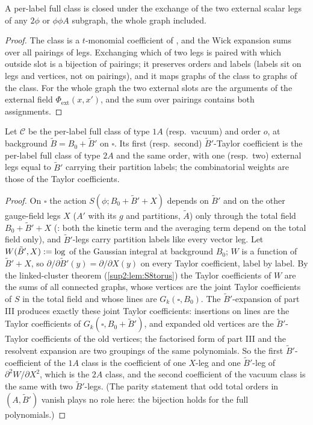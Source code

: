 \begin{lemma}\label{sup4:lem:S1441}
A per-label full class is closed under the exchange of the two external scalar legs of any $2\phi$ or $\phi\phi A$ subgraph, the whole graph included.
\end{lemma}

\begin{proof}
The class is a $t$-monomial coefficient of \cite[(1.5)]{Ba3}, and the Wick expansion sums over all pairings of legs. Exchanging which of two legs is paired with which outside slot is a bijection of pairings; it preserves orders and labels (labels sit on legs and vertices, not on pairings), and it maps graphs of the class to graphs of the class. For the whole graph the two external slots are the arguments of the external field $\Phi_{\mathrm{ext}}(x,x')$, and the sum over pairings contains both assignments.
\end{proof}

\begin{lemma}\label{sup4:lem:S1442}
Let $\mathcal C$ be the per-label full class of type $1A$ (resp.\ vacuum) and order $o$, at background $\tilde B=B_0+\tilde B'$ on $\square$. Its first (resp.\ second) $\tilde B'$-Taylor coefficient is the per-label full class of type $2A$ and the same order, with one (resp.\ two) external legs equal to $\tilde B'$ carrying their partition labels; the combinatorial weights are those of the Taylor coefficients.
\end{lemma}

\begin{proof}
On $\square$ the action $S(\phi;B_0+\tilde B'+X)$ depends on $\tilde B'$ and on the other gauge-field legs $X$ ($A'$ with its $g$ and partitions, $\tilde A$) only through the total field $B_0+\tilde B'+X$ (\cite[(1.4)]{Ba3}: both the kinetic term and the averaging term depend on the total field only), and $\tilde B'$-legs carry partition labels like every vector leg. Let $W(\tilde B',X):=\log$ of the Gaussian integral at background $B_0$; $W$ is a function of $\tilde B'+X$, so $\partial/\partial\tilde B'(y)=\partial/\partial X(y)$ on every Taylor coefficient, label by label. By the linked-cluster theorem (\cref{sup2:lem:S8torus}) the Taylor coefficients of $W$ are the sums of all connected graphs, whose vertices are the joint Taylor coefficients of $S$ in the total field and whose lines are $G_k(\square,B_0)$. The $\tilde B'$-expansion of part III produces exactly these joint Taylor coefficients: insertions on lines are the Taylor coefficients of $G_k(\square,B_0+\tilde B')$, and expanded old vertices are the $\tilde B'$-Taylor coefficients of the old vertices; the factorised form of part III and the resolvent expansion \cite[(3.44)]{Ba1} are two groupings of the same polynomials. So the first $\tilde B'$-coefficient of the $1A$ class is the coefficient of one $X$-leg and one $\tilde B'$-leg of $\partial^2W/\partial X^2$, which is the $2A$ class, and the second coefficient of the vacuum class is the same with two $\tilde B'$-legs. (The parity statement that odd total orders in $(A,\tilde B')$ vanish plays no role here: the bijection holds for the full polynomials.)
\end{proof}

